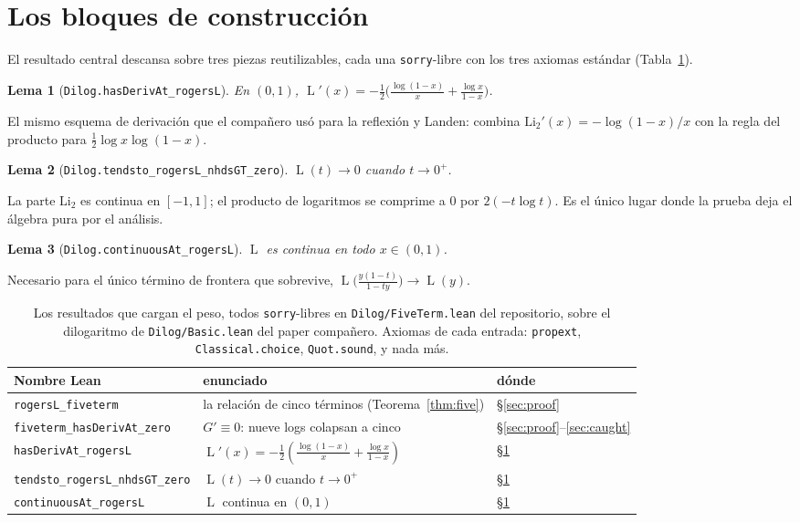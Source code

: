 \documentclass[11pt]{article}
\newtheorem{lemma}{Lema}
\newcommand{\lean}[1]{\texttt{#1}}
\newcommand{\Li}{\mathrm{Li}_2}
\DeclareMathOperator{\Lrog}{L}
\begin{document}
\section{Los bloques de construcci\'on}\label{sec:blocks}

El resultado central descansa sobre tres piezas reutilizables, cada una \lean{sorry}-libre
con los tres axiomas est\'andar (Tabla~\ref{tab:inventory}).

\begin{lemma}[\lean{Dilog.hasDerivAt\_rogersL}]
En $(0,1)$, $\displaystyle\Lrog'(x)=-\tfrac12\Big(\tfrac{\log(1-x)}{x}+\tfrac{\log
x}{1-x}\Big)$.
\end{lemma}
El mismo esquema de derivaci\'on que el compa\~nero us\'o para la reflexi\'on y Landen:
combina $\Li'(x)=-\log(1-x)/x$ con la regla del producto para $\tfrac12\log x\log(1-x)$.

\begin{lemma}[\lean{Dilog.tendsto\_rogersL\_nhdsGT\_zero}]
$\Lrog(t)\to0$ cuando $t\to0^+$.
\end{lemma}
La parte $\Li$ es continua en $[-1,1]$; el producto de logaritmos se comprime a $0$ por
$2(-t\log t)$. Es el \'unico lugar donde la prueba deja el \'algebra pura por el an\'alisis.

\begin{lemma}[\lean{Dilog.continuousAt\_rogersL}]
$\Lrog$ es continua en todo $x\in(0,1)$.
\end{lemma}
Necesario para el \'unico t\'ermino de frontera que sobrevive,
$\Lrog\big(\tfrac{y(1-t)}{1-ty}\big)\to\Lrog(y)$.

\begin{table}[h]
\centering\small
{}
\begin{tabular}{@{}lll@{}}
\toprule
\rowcolor{ggteal!18} Nombre Lean & enunciado & d\'onde \\
\midrule
\lean{rogersL\_fiveterm} & la relaci\'on de cinco t\'erminos (Teorema~\ref{thm:five}) & \S\ref{sec:proof} \\
\lean{fiveterm\_hasDerivAt\_zero} & $G'\equiv0$: nueve logs colapsan a cinco & \S\ref{sec:proof}--\ref{sec:caught} \\
\lean{hasDerivAt\_rogersL} & $\Lrog'(x)=-\tfrac12(\tfrac{\log(1-x)}{x}+\tfrac{\log x}{1-x})$ & \S\ref{sec:blocks} \\
\lean{tendsto\_rogersL\_nhdsGT\_zero} & $\Lrog(t)\to0$ cuando $t\to0^+$ & \S\ref{sec:blocks} \\
\lean{continuousAt\_rogersL} & $\Lrog$ continua en $(0,1)$ & \S\ref{sec:blocks} \\
\bottomrule
\end{tabular}
\caption{Los resultados que cargan el peso, todos \lean{sorry}-libres en
\lean{Dilog/FiveTerm.lean} del repositorio, sobre el dilogaritmo de \lean{Dilog/Basic.lean}
del paper compa\~nero. Axiomas de cada entrada: \lean{propext}, \lean{Classical.choice},
\lean{Quot.sound}, y nada m\'as.}
\label{tab:inventory}
\end{table}
\end{document}
